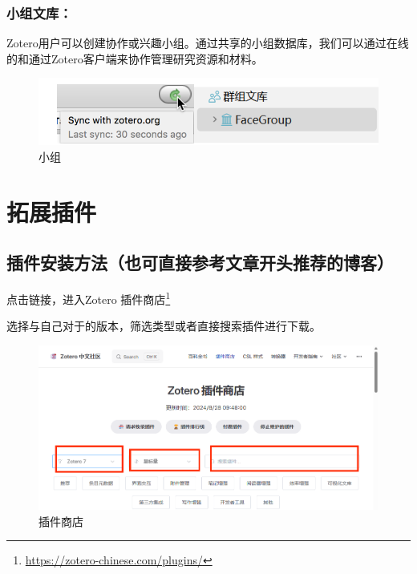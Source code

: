 \documentclass[]{ctexbook}
\renewcommand{\href}[2]{#2\footnote{\url{#1}}}
\theoremstyle{definition}
\theoremstyle{definition}
\theoremstyle{definition}
\theoremstyle{definition}
\theoremstyle{remark}
\begin{document}
\subsubsection{小组文库：}\label{ux5c0fux7ec4ux6587ux5e93}

Zotero用户可以创建协作或兴趣小组。通过共享的小组数据库，我们可以通过在线的和通过Zotero客户端来协作管理研究资源和材料。

\begin{figure}

{\centering \includegraphics[width=1\linewidth]{img/zotero/zotero_groupwork} 

}

\caption{小组}\label{fig:zotero-groupwork}
\end{figure}

\section{拓展插件}\label{ux62d3ux5c55ux63d2ux4ef6}

\subsection{插件安装方法（也可直接参考文章开头推荐的博客）}\label{ux63d2ux4ef6ux5b89ux88c5ux65b9ux6cd5ux4e5fux53efux76f4ux63a5ux53c2ux8003ux6587ux7ae0ux5f00ux5934ux63a8ux8350ux7684ux535aux5ba2}

点击链接，进入\href{https://zotero-chinese.com/plugins/}{Zotero 插件商店}

选择与自己对于的版本，筛选类型或者直接搜索插件进行下载。

\begin{figure}

{\centering \includegraphics[width=0.7\linewidth]{img/zotero/zotero_plugins_interface} 

}

\caption{插件商店}\label{fig:zotero-plugins-interface}
\end{figure}
\end{document}

